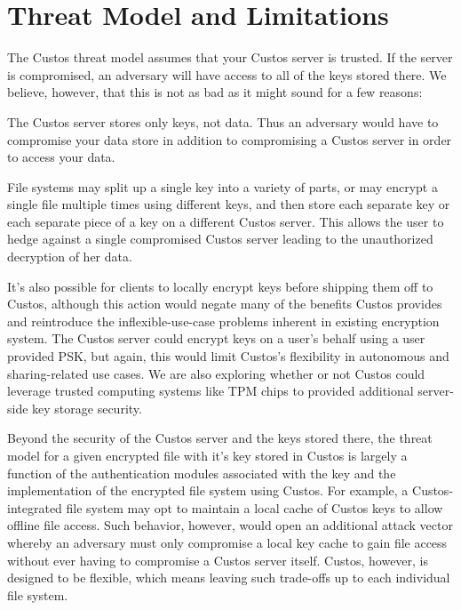 \section{Threat Model and Limitations}
\label{sec:model}

The Custos threat model assumes that your Custos server is trusted. If
the server is compromised, an adversary will have access to all of the
keys stored there. We believe, however, that this is not as bad as it
might sound for a few reasons:

\begin{packed_item}
\item The Custos server stores only keys, not data. Thus an adversary
  would have to compromise your data store in addition to compromising
  a Custos server in order to access your data.
\item File systems may split up a single key into a variety of parts,
  or may encrypt a single file multiple times using different keys,
  and then store each separate key or each separate piece of a key on
  a different Custos server. This allows the user to hedge against a
  single compromised Custos server leading to the unauthorized
  decryption of her data.
\end{packed_item}

It's also possible for clients to locally encrypt keys before shipping
them off to Custos, although this action would negate many of the
benefits Custos provides and reintroduce the inflexible-use-case
problems inherent in existing encryption system. The Custos server
could encrypt keys on a user's behalf using a user provided PSK, but
again, this would limit Custos's flexibility in autonomous and
sharing-related use cases. We are also exploring whether or not Custos
could leverage trusted computing systems like TPM chips to provided
additional server-side key storage security.

Beyond the security of the Custos server and the keys stored there,
the threat model for a given encrypted file with it's key stored in
Custos is largely a function of the authentication modules associated
with the key and the implementation of the encrypted file system using
Custos. For example, a Custos-integrated file system may opt to
maintain a local cache of Custos keys to allow offline file
access. Such behavior, however, would open an additional attack vector
whereby an adversary must only compromise a local key cache to gain
file access without ever having to compromise a Custos server
itself. Custos, however, is designed to be flexible, which means
leaving such trade-offs up to each individual file system.

